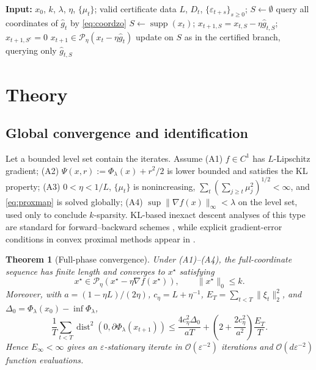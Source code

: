 \documentclass{article}
\newtheorem{theorem}{Theorem}
\newcommand{\supp}{\operatorname{supp}}
\newcommand{\dist}{\operatorname{dist}}
\newcommand{\eps}{\varepsilon}
\newcommand{\Peta}{\mathcal{P}_{\eta}}
\begin{document}
\begin{algorithm}[t]
\caption{ZO-IDEP}
\label{alg:idep}
\begin{algorithmic}[1]
\STATE \textbf{Input:} $x_0$, $k$, $\lambda$, $\eta$, $\{\mu_t\}$; valid certificate data $L$, $D_t$, $\{\eps_{t+s}\}_{s\ge0}$; $S\leftarrow\emptyset$
\STATE query all coordinates of $\widehat g_t$ by \eqref{eq:coordzo}
\IF{$|\supp(x_t)|=k$ and \eqref{eq:convexcert} holds at $x=x_t$}
\STATE $S\leftarrow\supp(x_t)$; $x_{t+1,S}=x_{t,S}-\eta\widehat g_{t,S}$; $x_{t+1,S^c}=0$
\ELSE
\STATE $x_{t+1}\in\Peta(x_t-\eta\widehat g_t)$
\ENDIF
\ELSE
\STATE update on $S$ as in the certified branch, querying only $\widehat g_{t,S}$
\ENDIF
\ENDFOR
\end{algorithmic}
\end{algorithm}

\section{Theory}
\subsection{Global convergence and identification}
Let a bounded level set contain the iterates. Assume (A1) $f\in C^1$ has $L$-Lipschitz gradient; (A2) $\Psi(x,r):=\Phi_\lambda(x)+r^2/2$ is lower bounded and satisfies the KL property; (A3) $0<\eta<1/L$, $\{\mu_t\}$ is nonincreasing,
$\sum_t(\sum_{j\ge t}\mu_j^2)^{1/2}<\infty$, and \eqref{eq:proxmap} is solved globally; (A4) $\sup\|\nabla f(x)\|_\infty<\lambda$ on the level set, used only to conclude $k$-sparsity. KL-based inexact descent analyses of this type are standard for forward--backward schemes \cite{attouch2013convergence,bonettini2023abstract}, while explicit gradient-error conditions in convex proximal methods appear in \cite{schmidt2011inexact}.

\begin{theorem}[Full-phase convergence]\label{thm:global}
Under (A1)--(A4), the full-coordinate sequence has finite length and converges to $x^\star$ satisfying
\begin{equation}
 x^\star\in\Peta(x^\star-\eta\nabla f(x^\star)),\qquad \|x^\star\|_0\le k.
 \label{eq:pstat}
\end{equation}
Moreover, with $a=(1-\eta L)/(2\eta)$, $c_\eta=L+\eta^{-1}$, $E_T=\sum_{t<T}\|\xi_t\|_2^2$, and $\Delta_0=\Phi_\lambda(x_0)-\inf\Phi_\lambda$,
\begin{equation}
\frac1T\sum_{t<T}\dist^2(0,\partial\Phi_\lambda(x_{t+1}))
\le \frac{4c_\eta^2\Delta_0}{aT}
+\left(2+\frac{2c_\eta^2}{a^2}\right)\frac{E_T}{T}.
\label{eq:globalrate}
\end{equation}
Hence $E_\infty<\infty$ gives an $\eps$-stationary iterate in $\mathcal O(\eps^{-2})$ iterations and $\mathcal O(d\eps^{-2})$ function evaluations.
\end{theorem}
\end{document}
